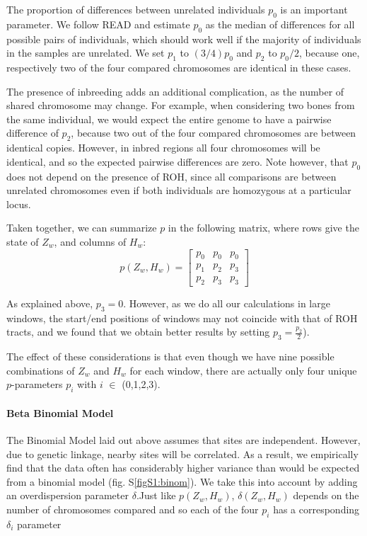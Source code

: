 \documentclass[12pt, letterpaper]{article}
\begin{document}
The proportion of differences between unrelated individuals $p_0$ is an important parameter. We follow READ \cite{kuhn_estimating_2018} and estimate $p_0$ as the median of differences for all possible pairs of individuals, which should work well if the majority of individuals in the samples are unrelated. We set $p_1$ to $(3/4)p_0$ and $p_2$ to $p_0/2$, because one, respectively two of the four compared chromosomes are identical in these cases.

The presence of inbreeding adds an additional complication, as the number of shared chromosome may  change. For example, when considering two bones from the same individual, we would expect the entire genome to have a pairwise difference of $p_2$, because two out of the four compared chromosomes are between identical copies. However, in inbred regions all four chromosomes will be identical, and so the expected pairwise differences are zero. Note however, that $p_0$ does not depend on the presence of ROH, since all comparisons are between unrelated chromosomes even if both individuals are homozygous at a particular locus. 

Taken together, we can summarize $p$ in the following matrix, where rows give the state of $Z_w$, and columns of $H_w$:
\begin{equation}\label{eq:2}
    p(Z_w, H_w) = \left[\begin{array}
{rrr}
p_0 & p_0 & p_0 \\
p_1 & p_2 & p_3 \\
p_2 & p_3 & p_3
\end{array}\right]
\end{equation}

As explained above, $p_3 = 0$. However, as we do all our calculations in large windows, the start/end positions of windows may not coincide with that of ROH tracts, and we found that we obtain better results by setting $p_3 = \frac{p_2}{2}$).

The effect of these considerations is that even though we have nine possible combinations of $Z_w$ and $H_w$ for each window, there are actually only four unique $p$-parameters $p_i$ with $i$ $\in$ (0,1,2,3). 

\paragraph{Beta Binomial Model}
The Binomial Model laid out above assumes that sites are independent. However, due to genetic linkage, nearby sites will be correlated. As a result, we empirically find that the data often has considerably higher variance than would be expected from a binomial model (fig. S\ref{figS1:binom}). We take this into account by adding an overdispersion parameter $\delta$.Just like $p(Z_w,H_w)$, $\delta(Z_w,H_w)$ depends on the number of chromosomes compared and so each of the  four $p_i$ has a corresponding $\delta_i$ parameter 
\end{document}

